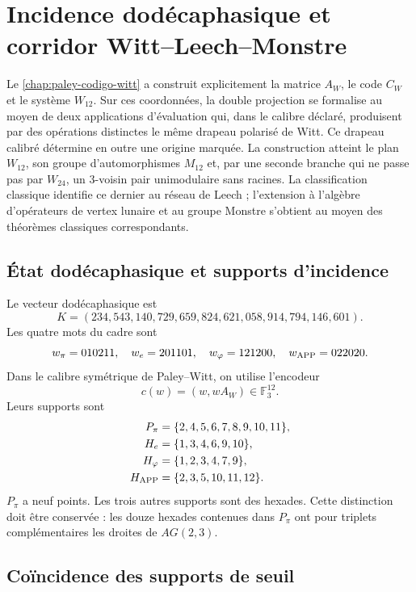 \chapter{Incidence dodécaphasique et corridor Witt--Leech--Monstre}
\label{chap:bandera-excepcional-acumulativa}

Le \cref{chap:paley-codigo-witt} a construit explicitement la matrice
\(A_W\), le code \(C_W\) et le système \(W_{12}\). Sur ces coordonnées,
la double projection se formalise au moyen de deux applications d'évaluation qui,
dans le calibre déclaré, produisent par des opérations distinctes le même drapeau
polarisé de Witt. Ce drapeau calibré détermine en outre une origine marquée. La
construction atteint le plan \(W_{12}\), son groupe d'automorphismes
\(M_{12}\) et, par une seconde branche qui ne passe pas par \(W_{24}\), un
3-voisin pair unimodulaire sans racines. La classification classique identifie ce
dernier au réseau de Leech ; l'extension à l'algèbre d'opérateurs de
vertex lunaire et au groupe Monstre s'obtient au moyen des théorèmes classiques
correspondants.

\section{État dodécaphasique et supports d'incidence}

Le vecteur dodécaphasique est
\[
K=(234,543,140,729,659,824,621,058,914,794,146,601).
\]
Les quatre mots du cadre sont
\[
w_\pi=010211,
\quad
w_e=201101,
\quad
w_\varphi=121200,
\quad
w_{\rm APP}=022020.
\]
Dans le calibre symétrique de Paley--Witt, on utilise l'encodeur
\[
c(w)=(w,wA_W)\in\mathbb F_3^{12}.
\]
Leurs supports sont
\[
\begin{aligned}
P_\pi&=\{2,4,5,6,7,8,9,10,11\},\\
H_e&=\{1,3,4,6,9,10\},\\
H_\varphi&=\{1,2,3,4,7,9\},\\
H_{\rm APP}&=\{2,3,5,10,11,12\}.
\end{aligned}
\]
\(P_\pi\) a neuf points. Les trois autres supports sont des hexades. Cette
distinction doit être conservée : les douze hexades contenues dans \(P_\pi\) ont
pour triplets complémentaires les droites de \(AG(2,3)\).

\section{Coïncidence des supports de seuil}

